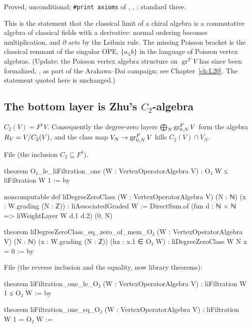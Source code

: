 \begin{status}
Proved, unconditional; \texttt{\#print axioms} of \allowbreak{}\allowbreak{},
\allowbreak{}, \allowbreak{}\allowbreak{}: standard three.
\end{status}

\begin{physics}
This is the statement that the classical limit of a chiral algebra is a commutative algebra of classical
fields with a derivative: normal ordering becomes multiplication, and $\partial$ acts by the Leibniz rule. The
missing Poisson bracket is the classical remnant of the singular OPE, $\{a_\lambda b\}$ in the language of
Poisson vertex algebras. (Update: the Poisson vertex algebra structure on $\operatorname{gr}^FV$ has since been
formalized, , as part of the Arakawa--Dai campaign; see Chapter~\ref{ch:L20}. The statement
quoted here is unchanged.)
\end{physics}

\subsection{The bottom layer is Zhu's \texorpdfstring{$C_2$}{C2}-algebra}

\begin{theorem}[Li: $F^1V = C_2(V)$; $\lelevengr^F_0V = \lelevenR$]\label{l11:thm:f1}
$C_2(V) = F^1V$. Consequently the degree-zero layers $\bigoplus_N\operatorname{gr}^F_{0,N}V$ form the algebra
$R_V = V/C_2(V)$, and the class map $V_N\to\operatorname{gr}^F_{0,N}V$ kills $C_2(V)\cap V_N$.
\end{theorem}
\noindent File  (the inclusion $C_2\subseteq F^1$).
\begin{leancode}
theorem O₂_le_liFiltration_one (W : VertexOperatorAlgebra V) :
    O₂ W ≤ liFiltration W 1 := by

noncomputable def liDegreeZeroClass (W : VertexOperatorAlgebra V) (N : ℕ)
    (x : W.grading (N : ℤ)) : liAssociatedGraded W :=
  DirectSum.of (fun d : ℕ × ℕ => liWeightLayer W d.1 d.2) (0, N)

theorem liDegreeZeroClass_eq_zero_of_mem_O₂ (W : VertexOperatorAlgebra V) (N : ℕ)
    (x : W.grading (N : ℤ)) (hx : x.1 ∈ O₂ W) :
    liDegreeZeroClass W N x = 0 := by
\end{leancode}
\noindent File  (the reverse inclusion and the equality, now
library theorems):
\begin{leancode}
theorem liFiltration_one_le_O₂ (W : VertexOperatorAlgebra V) :
    liFiltration W 1 ≤ O₂ W := by

theorem liFiltration_one_eq_O₂ (W : VertexOperatorAlgebra V) :
    liFiltration W 1 = O₂ W :=
\end{leancode}

